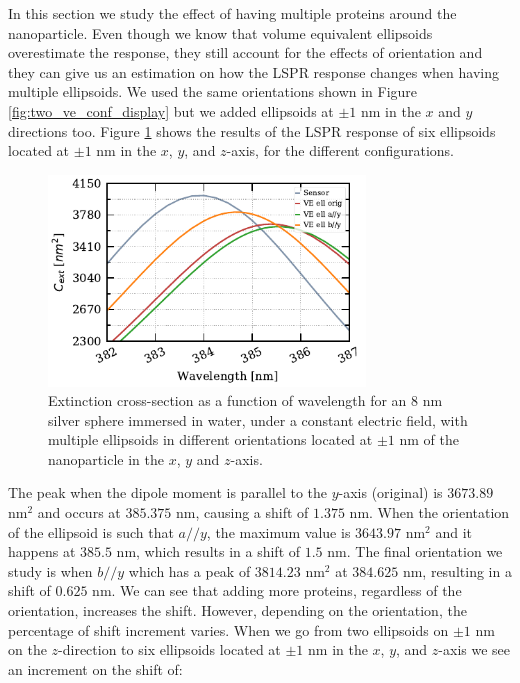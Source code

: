 In this section we study the effect of having multiple proteins around the nanoparticle. Even though we know 
that volume equivalent ellipsoids overestimate the response, they still account for the effects of 
orientation and they can give us an estimation on how the LSPR response changes when having multiple 
ellipsoids. We used the same orientations shown in Figure \ref{fig:two_ve_conf_display} but we added ellipsoids 
at $\pm 1$ nm in the $x$ and $y$ directions too. Figure \ref{fig:mult_ell} shows the results of the LSPR response 
of six ellipsoids located at $\pm 1$ nm in the $x$, $y$, and $z$-axis, for the different configurations. 
 
\begin{figure} %
    \centering
    \includegraphics[width=0.75\textwidth]{six_ve_ell_mult_config.pdf} 
    \caption{Extinction cross-section as a function of wavelength for an $8$ nm
            silver sphere immersed in water, under a constant electric field, with multiple ellipsoids in different orientations 
            located at $\pm 1$ nm of the nanoparticle in the $x$, $y$ and $z$-axis.}
    \label{fig:mult_ell}
 \end{figure}

 The peak when the dipole moment is parallel to the $y$-axis (original) is $3673.89$ nm$^2$ and occurs at $385.375$ nm, causing a shift of 
 $1.375$ nm. When the orientation of the ellipsoid is such that $a//y$, the maximum value is $3643.97$ nm$^2$ and it
 happens at $385.5$ nm, which results in a shift of $1.5$ nm. The final orientation we study is when $b//y$ which 
 has a peak of $3814.23$ nm$^2$ at $384.625$ nm, resulting in a shift of $0.625$ nm. We can see that adding more proteins, 
 regardless of the orientation, increases the shift. However, depending on the orientation, the percentage of shift increment 
 varies. When we go from two ellipsoids on $\pm 1$ nm on the $z$-direction to six ellipsoids located at 
 $\pm 1$ nm in the $x$, $y$, and $z$-axis we see an increment on the shift of:
 
